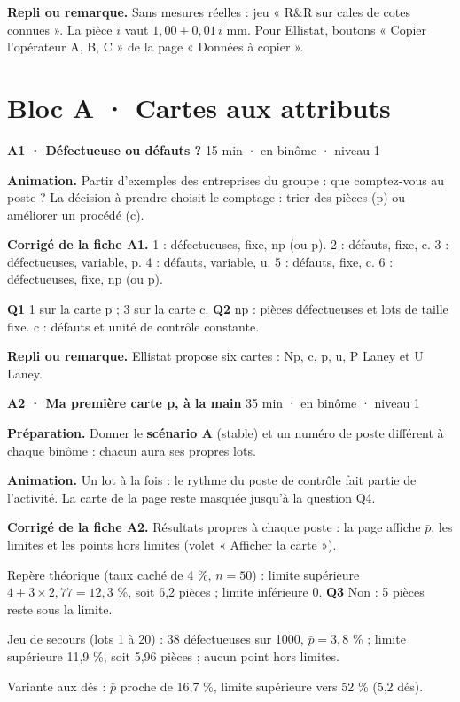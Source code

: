 {\small\textbf{Repli ou remarque.} Sans mesures réelles : jeu « R\&R sur cales de cotes connues ». La pièce $i$ vaut $1{,}00 + 0{,}01\,i$ mm. Pour Ellistat, boutons « Copier l'opérateur A, B, C » de la page « Données à copier ».}\par
\vspace{3pt}
\section*{Bloc A · Cartes aux attributs}
\begin{tcolorbox}[act]\textbf{A1 · Défectueuse ou défauts ?} \hfill {\small 15 min · en binôme · niveau 1}\end{tcolorbox}
\textbf{Animation.} Partir d'exemples des entreprises du groupe : que comptez-vous au poste ? La décision à prendre choisit le comptage : trier des pièces (p) ou améliorer un procédé (c).\par
\textbf{\color{ok}Corrigé de la fiche A1.} 1 : défectueuses, fixe, np (ou p). 2 : défauts, fixe, c. 3 : défectueuses, variable, p. 4 : défauts, variable, u. 5 : défauts, fixe, c. 6 : défectueuses, fixe, np (ou p).\par \textbf{Q1} 1 sur la carte p ; 3 sur la carte c. \textbf{Q2} np : pièces défectueuses et lots de taille fixe. c : défauts et unité de contrôle constante.\par
{\small\textbf{Repli ou remarque.} Ellistat propose six cartes : Np, c, p, u, P Laney et U Laney.}\par
\vspace{3pt}
\begin{tcolorbox}[act]\textbf{A2 · Ma première carte p, à la main} \hfill {\small 35 min · en binôme · niveau 1}\end{tcolorbox}
\textbf{Préparation.} Donner le \textbf{scénario A} (stable) et un numéro de poste différent à chaque binôme : chacun aura ses propres lots.\par
\textbf{Animation.} Un lot à la fois : le rythme du poste de contrôle fait partie de l'activité. La carte de la page reste masquée jusqu'à la question Q4.\par
\textbf{\color{ok}Corrigé de la fiche A2.} Résultats propres à chaque poste : la page affiche $\bar p$, les limites et les points hors limites (volet « Afficher la carte »).\par Repère théorique (taux caché de 4 \%, $n = 50$) : limite supérieure $4 + 3 \times 2{,}77 = 12{,}3$ \%, soit 6,2 pièces ; limite inférieure 0. \textbf{Q3} Non : 5 pièces reste sous la limite.\par Jeu de secours (lots 1 à 20) : 38 défectueuses sur 1000, $\bar p = 3{,}8$ \% ; limite supérieure 11,9 \%, soit 5,96 pièces ; aucun point hors limites.\par Variante aux dés : $\bar p$ proche de 16,7 \%, limite supérieure vers 52 \% (5,2 dés).\par
